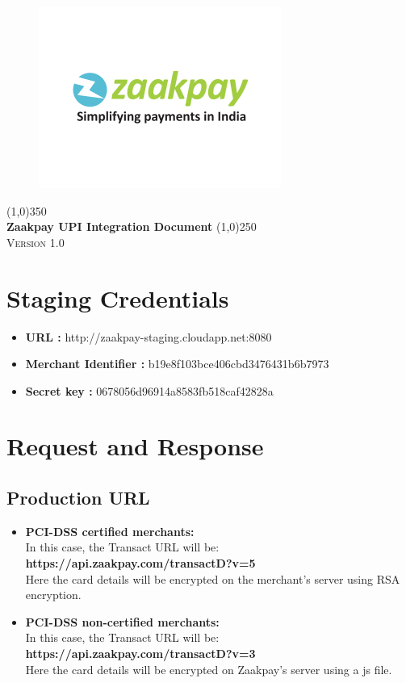\documentclass{article}
\begin{document}
\begin{titlepage}
\begin{center}
\begin{figure}[H]
\centering
\includegraphics[width=2.8 in]{306.png}
\end{figure}
\line(1,0){350}\\
\huge{\bfseries Zaakpay UPI Integration Document}
\line(1,0){250}\\
[1.5cm]
\textsc{\Large Version 1.0}
\end{center}


\end{titlepage}
\section{Staging Credentials}
\begin{itemize}
\item {\bfseries URL : } http://zaakpay-staging.cloudapp.net:8080
\item {\bfseries Merchant Identifier :} b19e8f103bce406cbd3476431b6b7973
\item {\bfseries Secret key :} 0678056d96914a8583fb518caf42828a
\end{itemize}

\newpage
\section{Request and Response}
\subsection{Production URL}
\begin{itemize}
\item {\bfseries PCI-DSS certified merchants:}\\
In this case, the Transact URL will be: {\bfseries https://api.zaakpay.com/transactD?v=5}\\ Here the card details will be encrypted on the merchant's server using RSA encryption.
\item {\bfseries PCI-DSS non-certified merchants:}\\
In this case, the Transact URL will be: {\bfseries https://api.zaakpay.com/transactD?v=3}\\ Here the card details will be encrypted on Zaakpay's server using a js file.

\end{itemize}
\end{document}
